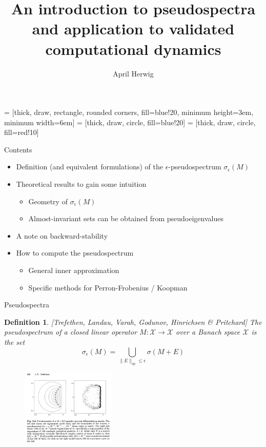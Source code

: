 \documentclass[
  english,            %
  aspectratio=169,    %
]{tumbeamer}
\title{An introduction to pseudospectra and application to validated computational dynamics}
\author{April Herwig}
\institute{\theChairName\\\theDepartmentName\\\theUniversityName}
\date{}
\newtheorem{definition}{Definition}
\newcommand{\cX}{\mathcal{X}}
\begin{document}
 = [thick, draw, rectangle, rounded corners, fill=blue!20,
                       minimum height=3em, minimum width=6em]
 = [thick, draw, circle, fill=blue!20]
 = [thick, draw, circle, fill=red!10]

\maketitle

\begin{frame}{Contents}
  
\begin{itemize}
  \item Definition (and equivalent formulations) of the $\epsilon$-pseudospectrum $\sigma_\epsilon (M)$
  \item Theoretical results to gain some intuition
  \begin{itemize}
    \item Geometry of $\sigma_\epsilon (M)$
    \item Almost-invariant sets can be obtained from pseudoeigenvalues
  \end{itemize}
  \item A note on backward-stability
  \item How to compute the pseudospectrum
  \begin{itemize}
    \item General inner approximation
    \item Specific methods for Perron-Frobenius / Koopman
  \end{itemize}
\end{itemize}

\end{frame}

\begin{frame}{Pseudospectra}

\begin{definition}

  [Trefethen, Landau, Varah, Godunov, Hinrichsen \& Pritchard]
  The pseudospectrum of a closed linear operator $M : \cX \to \cX$ over a Banach space $\cX$ is the set 
  \begin{equation}
    \sigma_\epsilon (M) = \bigcup_{\| E \|_{op} \leq \epsilon} \sigma (M + E)
  \end{equation}
\end{definition}

\begin{figure}
  \centering
  \includegraphics[width=0.4\textwidth]{random_perturbations_of_matrix.jpeg}
\end{figure}

\end{frame}
\end{document}
